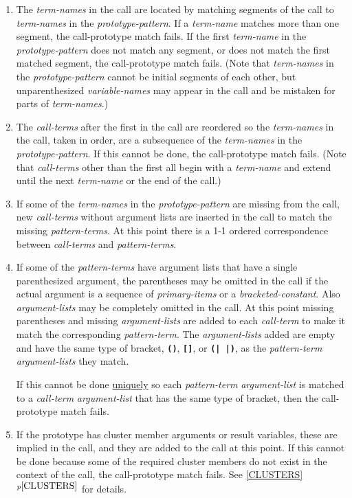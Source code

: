 \documentclass[12pt]{article}
\newcommand{\TT}[1]{{\tt \bfseries #1}}
\newcommand{\itemref}[1]{\ref{#1}$^{p\pageref{#1}}$}
\begin{document}
\begin{enumerate}
\item
The {\em term-names} in the call are located by
matching segments of the call to
{\em term-names} in the {\em prototype-pattern}.
If a {\em term-name} matches more than one segment,
the call-prototype match fails.  If the first {\em term-name}
in the {\em prototype-pattern} does not match any segment,
or does not match the first matched segment, the call-prototype match fails.
(Note that {\em term-names} in the {\em prototype-pattern}
cannot be initial segments of each other, but unparenthesized
{\em variable-names} may appear in the call and be
mistaken for parts of {\em term-names}.)

\item The {\em call-terms} after the first in the call
are reordered so the {\em term-names} in the call,
taken in order, are a subsequence of the {\em term-names} in the
{\em prototype-pattern}.
If this cannot be done, the call-prototype match fails.
(Note that {\em call-terms} other than the first all begin with
a {\em term-name} and extend until the next {\em term-name}
or the end of the call.)

\item\label{ADD-TERMS}
If some of the {\em term-names} in the {\em prototype-pattern}
are missing from the call,
new {\em call-terms} without argument lists
are inserted in the call to match the missing
{\em pattern-terms}.  At this point there is a 1-1 ordered correspondence
between {\em call-terms} and {\em pattern-terms}.

\item
If some of the {\em pattern-terms} have argument lists that
have a single parenthesized argument, the parentheses may be omitted
in the call if the actual argument is a sequence of
{\em primary-items} or a {\em bracketed-constant}.
Also {\em argument-lists}
may be completely omitted in the call.  At this point
missing parentheses and missing {\em argument-lists} are added to
each {\em call-term} to make it match the corresponding
{\em pattern-term}.
The {\em argument-lists} added are empty and have the same type of
bracket, \TT{()}, \TT{[]}, or \TT{(|~|)}, as the {\em pattern-term}
{\em argument-lists} they match.

If this cannot be done \underline{uniquely}
so each {\em pattern-term} {\em argument-list}
is matched to a {\em call-term} {\em argument-list}
that has the same type of bracket, then the call-prototype match fails.

\item
If the prototype
has cluster member arguments or result variables,
these are implied in the call, and they are added to the call
at this point.  If this cannot be done because some of the required
cluster members
do not exist in the context of the call, the call-prototype
match fails.  See \itemref{CLUSTERS} for details.


\end{enumerate}
\end{document}
